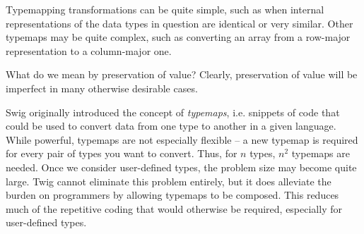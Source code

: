 Typemapping transformations can be quite simple, such as when internal representations of the data types in question are identical or very similar. Other typemaps may be quite complex, such as converting an array from a row-major representation to a column-major one.

What do we mean by preservation of value? Clearly, preservation of value will be imperfect in many otherwise desirable cases. 

Swig originally introduced the concept of \emph{typemaps}, i.e. snippets of code that could be used to convert data from one type to another in a given language. While powerful, typemaps are not especially flexible -- a new typemap is required for every pair of types you want to convert. Thus, for $n$ types, $n^2$ typemaps are needed. Once we consider user-defined types, the problem size may become quite large. Twig cannot eliminate this problem entirely, but it does alleviate the burden on programmers by allowing typemaps to be composed. This reduces much of the repetitive coding that would otherwise be required, especially for user-defined types.

